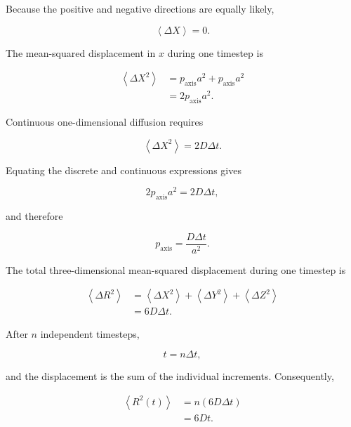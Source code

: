 \documentclass[11pt]{article}
\begin{document}
Because the positive and negative directions are equally likely,

\begin{equation}
    \left\langle \Delta X \right\rangle
    =
    0.
\end{equation}

The mean-squared displacement in \(x\) during one timestep is

\begin{align}
    \left\langle \Delta X^2 \right\rangle
    &=
    p_{\mathrm{axis}}a^2
    +
    p_{\mathrm{axis}}a^2 \\
    &=
    2p_{\mathrm{axis}}a^2.
\end{align}

Continuous one-dimensional diffusion requires

\begin{equation}
    \left\langle \Delta X^2 \right\rangle
    =
    2D\Delta t.
\end{equation}

Equating the discrete and continuous expressions gives

\begin{equation}
    2p_{\mathrm{axis}}a^2
    =
    2D\Delta t,
\end{equation}

and therefore

\begin{equation}
    \boxed{
        p_{\mathrm{axis}}
        =
        \frac{D\Delta t}{a^2}
    }.
\end{equation}

The total three-dimensional mean-squared displacement during one timestep is

\begin{align}
    \left\langle \Delta R^2 \right\rangle
    &=
    \left\langle \Delta X^2 \right\rangle
    +
    \left\langle \Delta Y^2 \right\rangle
    +
    \left\langle \Delta Z^2 \right\rangle \\
    &=
    6D\Delta t.
\end{align}

After \(n\) independent timesteps,

\begin{equation}
    t=n\Delta t,
\end{equation}

and the displacement is the sum of the individual increments. Consequently,

\begin{align}
    \left\langle R^2(t) \right\rangle
    &=
    n\left(6D\Delta t\right) \\
    &=
    6Dt.
\end{align}
\end{document}
